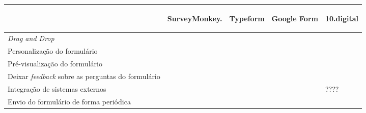 		\renewcommand{\arraystretch}{2.5}
		\setlength\arrayrulewidth{1.5pt}
	\begin{table}[!ht]  
		\begin{center}
		\begin{tabular}{|p{4cm}|p{1.5cm}|p{1.5cm}|p{1.5cm}|p{1.5cm}|}
			\cline{2-5}
			\multicolumn{1}{c|}{} & \hspace{0.6cm}\begin{sideways}SurveyMonkey.\end{sideways} & \hspace{0.6cm}\begin{sideways}Typeform\end{sideways} & \hspace{0.6cm}\begin{sideways}Google Form\end{sideways} &\hspace{0.6cm}\begin{sideways} 10.digital\end{sideways}\\ \hline
			
		
				\textit{Drag and Drop} & \cellcolor{green!80}   & \cellcolor{red!80}  & \cellcolor{red!80} & \cellcolor{red!80} \\ \hline
				
			Personalização do formulário& \cellcolor{green!80}    & \cellcolor{green!80}   & \cellcolor{yellow!80} & \cellcolor{green!80}   \\ \hline
			
			 Pré-visualização do formulário& \cellcolor{green!80}  & \cellcolor{green!80}  & \cellcolor{green!80} & \cellcolor{green!80} \\ \hline
			 
			 	Deixar \textit{feedback} sobre as perguntas do formulário& \cellcolor{red!80}    & \cellcolor{red!80}   & \cellcolor{red!80} & \cellcolor{green!80}   \\ \hline
			
			 Integração de sistemas externos& \cellcolor{red!80}   & \cellcolor{green!80} & \cellcolor{yellow!80}  & ????  \\ \hline
			
			Envio do formulário de forma periódica & \cellcolor{red!80}   & \cellcolor{red!80}  & \cellcolor{red!80} & \cellcolor{green!80} \\ \hline
			

\end{tabular}
\end{center}
\end{table}
